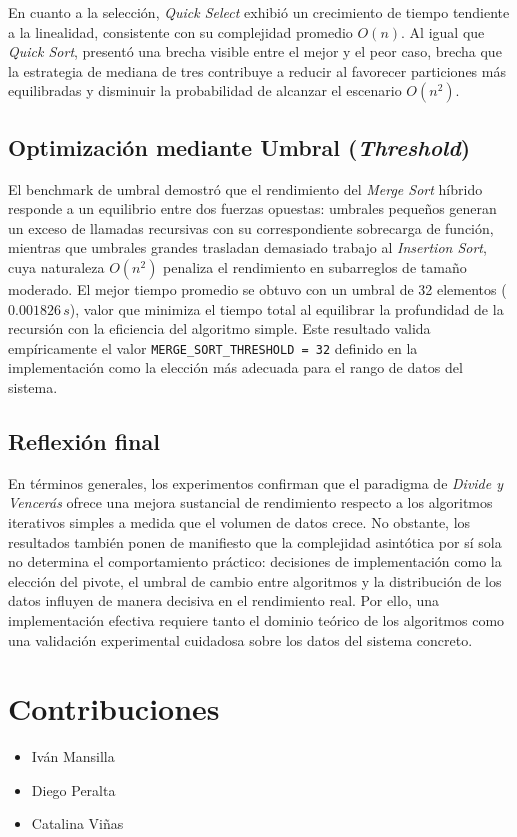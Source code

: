 En cuanto a la selección, \textit{Quick Select} exhibió un crecimiento de tiempo tendiente a la linealidad, consistente con su complejidad promedio \(O(n)\). Al igual que \textit{Quick Sort}, presentó una brecha visible entre el mejor y el peor caso, brecha que la estrategia de mediana de tres contribuye a reducir al favorecer particiones más equilibradas y disminuir la probabilidad de alcanzar el escenario \(O(n^2)\).

\section{Optimización mediante Umbral (\textit{Threshold})}

El benchmark de umbral demostró que el rendimiento del \textit{Merge Sort} híbrido responde a un equilibrio entre dos fuerzas opuestas: umbrales pequeños generan un exceso de llamadas recursivas con su correspondiente sobrecarga de función, mientras que umbrales grandes trasladan demasiado trabajo al \textit{Insertion Sort}, cuya naturaleza \(O(n^2)\) penaliza el rendimiento en subarreglos de tamaño moderado. El mejor tiempo promedio se obtuvo con un umbral de 32 elementos (\(0.001826\,s\)), valor que minimiza el tiempo total al equilibrar la profundidad de la recursión con la eficiencia del algoritmo simple. Este resultado valida empíricamente el valor \texttt{MERGE\_SORT\_THRESHOLD = 32} definido en la implementación como la elección más adecuada para el rango de datos del sistema.

\section{Reflexión final}

En términos generales, los experimentos confirman que el paradigma de \textit{Divide y Vencerás} ofrece una mejora sustancial de rendimiento respecto a los algoritmos iterativos simples a medida que el volumen de datos crece. No obstante, los resultados también ponen de manifiesto que la complejidad asintótica por sí sola no determina el comportamiento práctico: decisiones de implementación como la elección del pivote, el umbral de cambio entre algoritmos y la distribución de los datos influyen de manera decisiva en el rendimiento real. Por ello, una implementación efectiva requiere tanto el dominio teórico de los algoritmos como una validación experimental cuidadosa sobre los datos del sistema concreto.

\chapter{Contribuciones}

\begin{itemize}
    \item Iván Mansilla
    \item Diego Peralta
    \item Catalina Viñas
\end{itemize}


